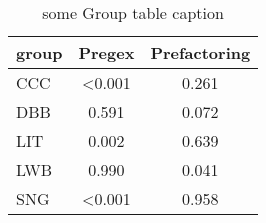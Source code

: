 \begin{table*}\begin{small}\begin{center}\caption{some Group table caption}\label{table:groupANOVATable}\begin{tabular}
{lcc}
group & Pregex & Prefactoring \\
\toprule[0.16em]
CCC & <0.001 & 0.261\\
DBB & 0.591 & 0.072\\
LIT & 0.002 & 0.639\\
LWB & 0.990 & 0.041\\
SNG & <0.001 & 0.958\\
\bottomrule[0.13em]\end{tabular}\end{center}\end{small}\end{table*}
